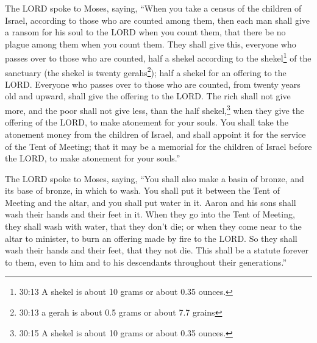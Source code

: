 \myverse{}The LORD spoke to Moses, saying,
\myverse{}“When you take a census of the children of Israel, according to those who
are counted among them, then each man shall give a ransom for his soul to the LORD when you count them,
that there be no plague among them when you count them.
\myverse{}They shall give this, everyone who passes over to those who are counted,
half a shekel according to the shekel\footnote{30:13 A shekel is about 10 grams or about 0.35 ounces.} of the sanctuary (the shekel is twenty
gerahs\footnote{30:13 a gerah is about 0.5 grams or about 7.7 grains}); half a shekel for an offering to the
LORD.
\myverse{}Everyone who passes over to those who are counted, from twenty years old
and upward, shall give the offering to the LORD.
\myverse{}The rich shall not give more, and the poor shall not give less, than the
half shekel,\footnote{30:15 A shekel is about 10 grams or about 0.35 ounces.} when they give the offering of the
LORD, to make atonement for your souls.
\myverse{}You shall take the atonement money from the children of Israel, and shall
appoint it for the service of the Tent of Meeting; that it may be a memorial for the children of Israel
before the LORD, to make atonement for your souls.”


\myverse{}The LORD spoke to Moses, saying,
\myverse{}“You shall also make a basin of bronze, and its base of bronze, in which
to wash. You shall put it between the Tent of Meeting and the altar, and you shall put water in it.
\myverse{}Aaron and his sons shall wash their hands and their feet in it.
\myverse{}When they go into the Tent of Meeting, they shall wash with water, that they
don’t die; or when they come near to the altar to minister, to burn an offering made by fire to the LORD.
\myverse{}So they shall wash their hands and their feet, that they not die. This shall
be a statute forever to them, even to him and to his descendants throughout their generations.”


